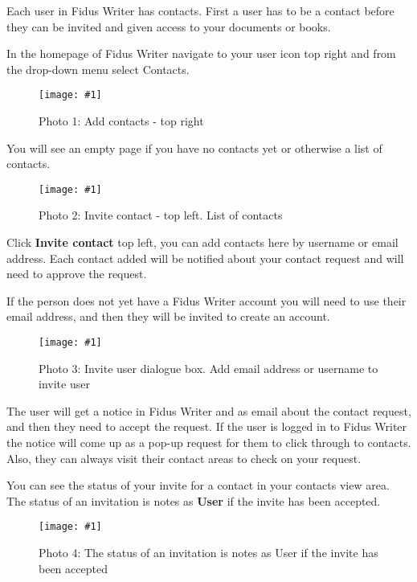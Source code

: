 \documentclass{article}
\newlength{\imgwidth}
\newcommand\scaledgraphics[2]{%
                
\settowidth{\imgwidth}{\texttt{[image: \#1]}}%
                
\setlength{\imgwidth}{\minof{\imgwidth}{#2\textwidth}}%
                
\texttt{[image: \#1]}%
                
}
\begin{document}
Each user in Fidus Writer has contacts. First a user has to be a contact before they can be invited and given access to your documents or books.


In the homepage of Fidus Writer navigate to your user icon top right and from the drop-down menu select Contacts.

\begin{figure}
\scaledgraphics{391bdb8e-5974-4212-b315-9847119c3c0e.png}{1}
\caption*{Photo 1: Add contacts - top right}\label{F81878771}
\end{figure}


You will see an empty page if you have no contacts yet or otherwise a list of contacts.

\begin{figure}
\scaledgraphics{e5be03dd-8e38-448d-b6dd-fce0412588c5.png}{1}
\caption*{Photo 2: Invite contact - top left. List of contacts}\label{F5073131}
\end{figure}


Click \textbf{Invite contact} top left, you can add contacts here by username or email address. Each contact added will be notified about your contact request and will need to approve the request. 


If the person does not yet have a Fidus Writer account you will need to use their email address, and then they will be invited to create an account.

\begin{figure}
\scaledgraphics{50f9c291-37a8-413e-b800-f17a3b6c680d.png}{1}
\caption*{Photo 3: Invite user dialogue box. Add email address or username to invite user}\label{F73625321}
\end{figure}


The user will get a notice in Fidus Writer and as email about the contact request, and then they need to accept the request. If the user is logged in to Fidus Writer the notice will come up as a pop-up request for them to click through to contacts. Also, they can always visit their contact areas to check on your request.


You can see the status of your invite for a contact in your contacts view area. The status of an invitation is notes as \textbf{User} if the invite has been accepted.

\begin{figure}
\scaledgraphics{c21f0041-95d0-4128-abe9-970886b5b0db.png}{1}
\caption*{Photo 4: The status of an invitation is notes as User if the invite has been accepted}\label{F98742551}
\end{figure}
\end{document}
